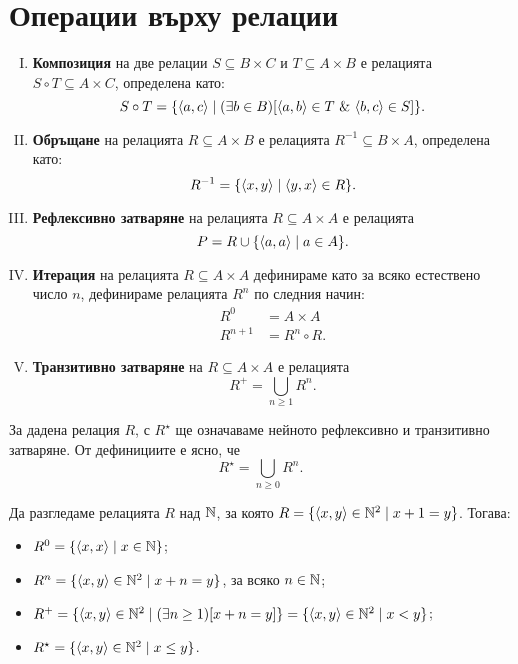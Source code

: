\section{Операции върху релации}
\begin{enumerate}[I)]
\item
  {\bf Композиция} на две релации $S \subseteq B\times C$ и $T \subseteq A\times B$ е релацията $S\circ T \subseteq A\times C$,
  определена като:
  \[S\circ T = \{\langle{a,c}\rangle \mid (\exists b \in B)[\pair{a,b}\in T\ \&\ \pair{b,c} \in S]\}.\]
\item
  {\bf Обръщане} на релацията $R \subseteq A\times B$ е релацията $R^{-1}\subseteq B\times A$, 
  определена като:
  \[R^{-1} = \{\langle{x,y}\rangle \mid \langle{y,x}\rangle \in R\}.\]
  \item
  {\bf Рефлексивно затваряне} на релацията $R \subseteq A\times A$ е релацията
  \[P = R \cup \{\langle{a,a}\rangle \mid a\in A\}.\]
\item
  {\bf Итерация} на релацията $R \subseteq A\times A$ дефинираме като за всяко естествено число $n$,
  дефинираме релацията $R^n$ по следния начин:
  \begin{align*}
    R^0 & = A\times A\\
    R^{n+1} & = R^n \circ R.
  \end{align*}
\item
  {\bf Транзитивно затваряне} на $R \subseteq A\times A$ е релацията
  \[R^+ = \bigcup_{n\geq 1} R^n.\]
\end{enumerate}

За дадена релация $R$, с $R^\star$ ще означаваме нейното рефлексивно и транзитивно затваряне.
От дефинициите е ясно, че \[R^\star = \bigcup_{n\geq 0} R^n.\]

\begin{example}
  Да разгледаме релацията $R$ над $\mathbb{N}$, за която
  $R = \{\langle{x,y}\rangle \in \mathbb{N}^2 \mid x+1 = y\}$. Тогава:
  \begin{itemize}
  \item 
    $R^0 = \{\langle{x,x}\rangle \mid x\in \mathbb{N}\}$;
  \item
    $R^n = \{\langle{x,y}\rangle \in \mathbb{N}^2 \mid x+n = y\}$, за всяко $n \in \mathbb{N}$;
  \item
    $R^+ = \{\langle{x,y}\rangle\in\mathbb{N}^2 \mid (\exists n\geq 1)[x+n = y]\} = \{\langle{x,y}\rangle \in \mathbb{N}^2 \mid x < y\}$;
  \item
    $R^\star = \{\langle{x,y}\rangle \in \mathbb{N}^2 \mid x \leq y\}$.
  \end{itemize}
\end{example}


